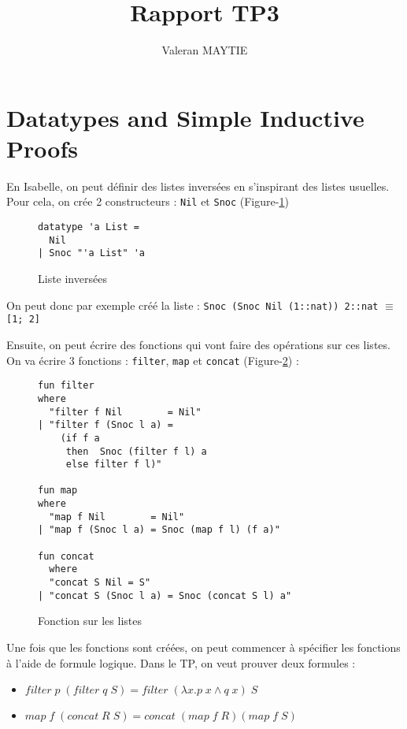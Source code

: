 \documentclass{article}
\title{Rapport TP3}
\author{Valeran MAYTIE}
\date{}
\theoremstyle{plain}
\begin{document}
  \maketitle

  \section{Datatypes and Simple Inductive Proofs}

  En Isabelle, on peut définir des listes inversées en s'inspirant des listes
  usuelles. Pour cela, on crée 2 constructeurs : \texttt{Nil} et \texttt{Snoc}
  (Figure-\ref{fig:list})

  \begin{figure}[thpb]
  \begin{lstlisting}
datatype 'a List =
  Nil
| Snoc "'a List" 'a
  \end{lstlisting}
  \caption{Liste inversées}
  \label{fig:list}
  \end{figure}

  On peut donc par exemple créé la liste : \texttt{Snoc (Snoc Nil (1::nat))
  2::nat} $\equiv$ \texttt{[1; 2]}

  Ensuite, on peut écrire des fonctions qui vont faire des opérations sur ces
  listes. On va écrire 3 fonctions : \texttt{filter}, \texttt{map} et
  \texttt{concat} (Figure-\ref{fig:fun}) :

  \begin{figure}[thpb]
  \begin{lstlisting}
fun filter
where
  "filter f Nil        = Nil"
| "filter f (Snoc l a) = 
    (if f a
     then  Snoc (filter f l) a
     else filter f l)"

fun map
where
  "map f Nil        = Nil"
| "map f (Snoc l a) = Snoc (map f l) (f a)"

fun concat
  where
  "concat S Nil = S"
| "concat S (Snoc l a) = Snoc (concat S l) a"
  \end{lstlisting}
  \caption{Fonction sur les listes}
  \label{fig:fun}
  \end{figure}

Une fois que les fonctions sont créées, on peut commencer à spécifier les
fonctions à l'aide de formule logique. Dans le TP, on veut prouver deux
formules :

\begin{itemize}
  \item $\textit{filter}\; p\;(\textit{filter}\;q\;S) =
         \textit{filter}\;(\lambda x. p\;x \wedge q\;x)\;S$
  \item $\textit{map}\;f\;(\textit{concat}\;R\;S) =
         \textit{concat}\;(\textit{map}\;f\;R)(\textit{map}\;f\;S)$
\end{itemize}
\end{document}
